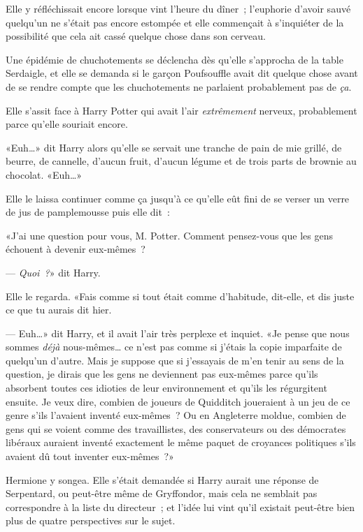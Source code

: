 \later

Elle y réfléchissait encore lorsque vint l'heure du dîner~; l'euphorie d'avoir sauvé quelqu'un ne s'était pas encore estompée et elle commençait à s'inquiéter de la possibilité que cela ait cassé quelque chose dans son cerveau.

Une épidémie de chuchotements se déclencha dès qu'elle s'approcha de la table Serdaigle, et elle se demanda si le garçon Poufsouffle avait dit quelque chose avant de se rendre compte que les chuchotements ne parlaient probablement pas de \emph{ça}.

Elle s'assit face à Harry Potter qui avait l'air \emph{extrêmement} nerveux, probablement parce qu'elle souriait encore.

«Euh…» dit Harry alors qu'elle se servait une tranche de pain de mie grillé, de beurre, de cannelle, d'aucun fruit, d'aucun légume et de trois parts de brownie au chocolat. «Euh…»

Elle le laissa continuer comme ça jusqu'à ce qu'elle eût fini de se verser un verre de jus de pamplemousse puis elle dit~:

«J'ai une question pour vous, M. Potter. Comment pensez-vous que les gens échouent à devenir eux-mêmes~?

--- \emph{Quoi~?}» dit Harry.

Elle le regarda. «Fais comme si tout était comme d'habitude, dit-elle, et dis juste ce que tu aurais dit hier.

--- Euh…» dit Harry, et il avait l'air très perplexe et inquiet. «Je pense que nous sommes \emph{déjà} nous-mêmes… ce n'est pas comme si j'étais la copie imparfaite de quelqu'un d'autre. Mais je suppose que si j'essayais de m'en tenir au sens de la question, je dirais que les gens ne deviennent pas eux-mêmes parce qu'ils absorbent toutes ces idioties de leur environnement et qu'ils les régurgitent ensuite. Je veux dire, combien de joueurs de Quidditch joueraient à un jeu de ce genre s'ils l'avaient inventé eux-mêmes~? Ou en Angleterre moldue, combien de gens qui se voient comme des travaillistes, des conservateurs ou des démocrates libéraux auraient inventé exactement le même paquet de croyances politiques s'ils avaient dû tout inventer eux-mêmes~?»

Hermione y songea. Elle s'était demandée si Harry aurait une réponse de Serpentard, ou peut-être même de Gryffondor, mais cela ne semblait pas correspondre à la liste du directeur~; et l'idée lui vint qu'il existait peut-être bien plus de quatre perspectives sur le sujet.

